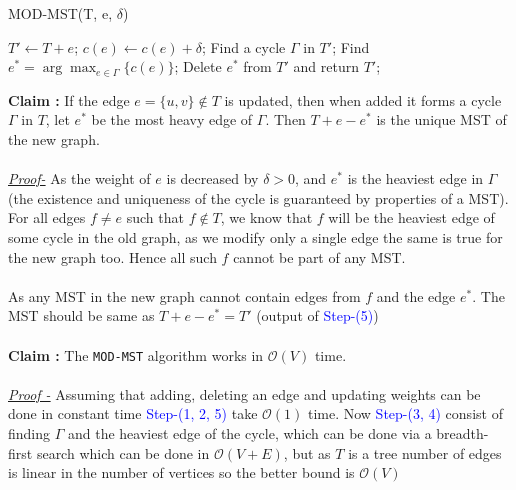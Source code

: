 \documentclass{article}
\newcommand{\stepNumber}[1]{\textcolor{blue}{Step-(#1)}}
\begin{document}
    \begin{algorithm}[H]
        \caption{MOD-MST(T, e, $\delta$)}
        \begin{algorithmic}[1]
            \State $T' \leftarrow T + e$;
            \State $c(e) \leftarrow c(e) + \delta$; 
            \Statex
            \State Find a cycle $\Gamma$ in $T'$;
            \State Find $e^* = \arg\max_{e \in \Gamma} \{c(e)\}$; 
            \State Delete $e^*$ from $T'$ and return $T'$;  
        \end{algorithmic}
    \end{algorithm}
    \noindent \textbf{Claim :} If the edge $e = \{u, v\} \notin T$ is updated, then when added it forms a cycle $\Gamma$ in $T$, let $e^*$ be the most heavy edge of $\Gamma$. Then $T+e-e^*$ is the unique MST of the new graph. \\\\
    \textit{\underline{Proof-}} As the weight of $e$ is decreased by $\delta > 0$, and $e^*$ is the heaviest edge in $\Gamma$ (the existence and uniqueness of the cycle is guaranteed by properties of a MST). For all edges $f\not= e$ such that $f\notin T$, we know that $f$ will be the heaviest edge of some cycle in the old graph, as we modify only a single edge the same is true for the new graph too. Hence all such $f$ cannot be part of any MST. \\\\
    As any MST in the new graph cannot contain edges from $f$ and the edge $e^*$. The MST should be same as $T+e-e^* = T'$ (output of \stepNumber{5})\\\\
    \noindent \textbf{Claim :} The \texttt{MOD-MST} algorithm works in $\mathcal{O}(V)$ time.\\\\
    \textit{\underline{Proof -}} Assuming that adding, deleting an edge and updating weights can be done in constant time \stepNumber{1, 2, 5} take $\mathcal{O}(1)$ time. Now \stepNumber{3, 4} consist of finding $\Gamma$ and the heaviest edge of the cycle, which can be done via a breadth-first search which can be done in $\mathcal{O}(V+E)$, but as $T$ is a tree number of edges is linear in the number of vertices so the better bound is $\mathcal{O}(V)$
    \newpage
\end{document}
